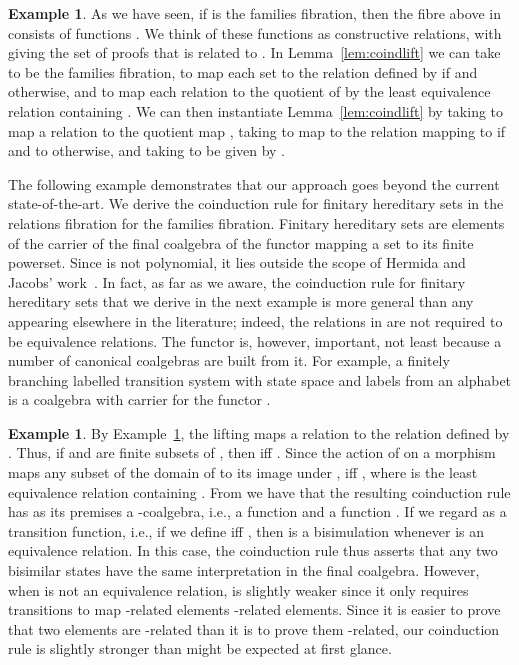 \documentclass{LMCS}
\theoremstyle{plain}
\theoremstyle{remark}
\theoremstyle{definition}
\newtheorem{example}[theorem]{Example}
\begin{document}
\begin{example}\label{ex:famrel}
  As we have seen, if  is the families fibration, then the fibre
  above  in  consists of functions . We think of these functions as constructive relations, with
   giving the set of proofs that  is related to . In
  Lemma~\ref{lem:coindlift} we can take  to be the families
  fibration,  to map each set  to the relation  defined by
   if  and  otherwise, and
   to map each relation  to the quotient
   of  by the least equivalence relation containing . We
  can then instantiate Lemma~\ref{lem:coindlift} by taking  to map a relation  to the
  quotient map , taking  to
  map  to the relation  mapping  to  if
   and to  otherwise, and taking  to be given by .
\end{example}

The following example demonstrates that our approach goes beyond the
current state-of-the-art. We derive the coinduction rule for finitary
hereditary sets in the relations fibration for the families
fibration. Finitary hereditary sets are elements of the carrier of the
final coalgebra of the functor  mapping a set to its finite
powerset. Since  is not polynomial, it lies outside the scope of
Hermida and Jacobs' work~\cite{hj98}. In fact, as far as we aware, the
coinduction rule for finitary hereditary sets that we derive in the
next example is more general than any appearing elsewhere in the
literature; indeed, the relations in  are not required to be
equivalence relations. The functor  is, however, important, not
least because a number of canonical coalgebras are built from it. For
example, a finitely branching labelled transition system with state
space  and labels from an alphabet  is a coalgebra with carrier
 for the functor .

\begin{example}\label{ex:coind}
  By Example~\ref{ex:famrel}, the lifting  maps a
  relation  to the relation  defined by . Thus, if  and  are finite subsets of , then  iff . Since
  the action of  on a morphism  maps any subset of the domain
  of  to its image under ,  iff
  , where
   is the least equivalence relation
  containing . From  we have that the resulting
  coinduction rule has as its premises a -coalgebra,
  i.e., a function  and a function . If we regard  as a transition
  function, i.e., if we define  iff , then
   is a bisimulation whenever  is an equivalence
  relation. In this case, the coinduction rule thus asserts that any
  two bisimilar states have the same interpretation in the final
  coalgebra.  However, when  is not an equivalence relation,
   is slightly weaker since it only requires
  transitions to map -related elements -related
  elements.  Since it is easier to prove that two elements are -related than it is to prove them -related, our coinduction
  rule is slightly stronger than might be expected at first glance.
\end{example}
\end{document}
